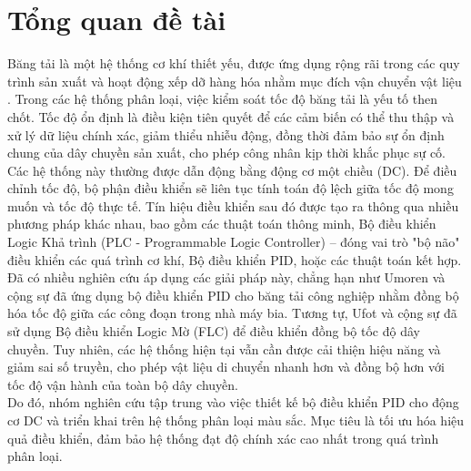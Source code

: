 \chapter{Tổng quan đề tài}
Băng tải là một hệ thống cơ khí thiết yếu, được ứng dụng rộng rãi trong các quy trình sản xuất và hoạt động xếp dỡ hàng hóa nhằm mục đích vận chuyển vật liệu \cite{ufot2017fuzzy}. Trong các hệ thống phân loại, việc kiểm soát tốc độ băng tải là yếu tố then chốt. Tốc độ ổn định là điều kiện tiên quyết để các cảm biến có thể thu thập và xử lý dữ liệu chính xác, giảm thiểu nhiễu động, đồng thời đảm bảo sự ổn định chung của dây chuyền sản xuất, cho phép công nhân kịp thời khắc phục sự cố.\\

Các hệ thống này thường được dẫn động bằng động cơ một chiều (DC). Để điều chỉnh tốc độ, bộ phận điều khiển sẽ liên tục tính toán độ lệch giữa tốc độ mong muốn và tốc độ thực tế. Tín hiệu điều khiển sau đó được tạo ra thông qua nhiều phương pháp khác nhau, bao gồm các thuật toán thông minh, Bộ điều khiển Logic Khả trình (PLC - Programmable Logic Controller) – đóng vai trò "bộ não" điều khiển các quá trình cơ khí, Bộ điều khiển PID, hoặc các thuật toán kết hợp.\\

Đã có nhiều nghiên cứu áp dụng các giải pháp này, chẳng hạn như Umoren và cộng sự \cite{umorn2016design} đã ứng dụng bộ điều khiển PID cho băng tải công nghiệp nhằm đồng bộ hóa tốc độ giữa các công đoạn trong nhà máy bia. Tương tự, Ufot và cộng sự \cite{ufot2017fuzzy} đã sử dụng Bộ điều khiển Logic Mờ (FLC) để điều khiển đồng bộ tốc độ dây chuyền. Tuy nhiên, các hệ thống hiện tại vẫn cần được cải thiện hiệu năng và giảm sai số truyền, cho phép vật liệu di chuyển nhanh hơn và đồng bộ hơn với tốc độ vận hành của toàn bộ dây chuyền.\\

Do đó, nhóm nghiên cứu tập trung vào việc thiết kế bộ điều khiển PID cho động cơ DC và triển khai trên hệ thống phân loại màu sắc. Mục tiêu là tối ưu hóa hiệu quả điều khiển, đảm bảo hệ thống đạt độ chính xác cao nhất trong quá trình phân loại.


